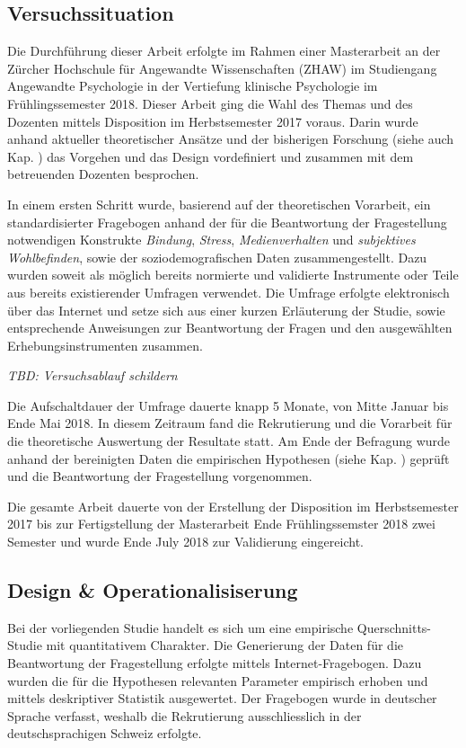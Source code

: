 \subsection{Versuchssituation}\label{sec:Versuchssituation}
Die Durchführung dieser Arbeit erfolgte im Rahmen einer Masterarbeit an der Zürcher Hochschule für Angewandte Wissenschaften (ZHAW) im Studiengang Angewandte Psychologie in der Vertiefung klinische Psychologie im Frühlingssemester 2018. Dieser Arbeit ging die Wahl des Themas und des Dozenten mittels Disposition im Herbstsemester 2017 voraus. Darin wurde anhand aktueller theoretischer Ansätze und der bisherigen Forschung (siehe auch Kap. ) das Vorgehen und das Design vordefiniert und zusammen mit dem betreuenden Dozenten besprochen. 

In einem ersten Schritt wurde, basierend auf der theoretischen Vorarbeit, ein standardisierter Fragebogen anhand der für die Beantwortung der Fragestellung notwendigen Konstrukte \textit{Bindung}, \textit{Stress}, \textit{Medienverhalten} und \textit{subjektives Wohlbefinden}, sowie der soziodemografischen Daten zusammengestellt. Dazu wurden soweit als möglich bereits normierte und validierte Instrumente oder Teile aus bereits existierender Umfragen verwendet. Die Umfrage erfolgte elektronisch über das Internet und setze sich aus einer kurzen Erläuterung der Studie, sowie entsprechende Anweisungen zur Beantwortung der Fragen und den ausgewählten Erhebungsinstrumenten zusammen. 

\textit{TBD: Versuchsablauf schildern}

Die Aufschaltdauer der Umfrage dauerte knapp 5 Monate, von Mitte Januar bis Ende Mai 2018. In diesem Zeitraum fand die Rekrutierung und die Vorarbeit für die theoretische Auswertung der Resultate statt. Am Ende der Befragung wurde anhand der bereinigten Daten die empirischen Hypothesen (siehe Kap. ) geprüft und die Beantwortung der Fragestellung vorgenommen.

Die gesamte Arbeit dauerte von der Erstellung der Disposition im Herbstsemester 2017 bis zur Fertigstellung der Masterarbeit Ende Frühlingssemster 2018 zwei Semester und wurde Ende July 2018 zur Validierung eingereicht.

\subsection{Design \& Operationalisiserung} \label{sec:Design}
Bei der vorliegenden Studie handelt es sich um eine empirische Querschnitts-Studie mit quantitativem Charakter. Die Generierung der Daten für die Beantwortung der Fragestellung erfolgte mittels Internet-Fragebogen. Dazu wurden die für die Hypothesen relevanten Parameter empirisch erhoben und mittels deskriptiver Statistik ausgewertet. Der Fragebogen wurde in deutscher Sprache verfasst, weshalb die Rekrutierung ausschliesslich in der deutschsprachigen Schweiz erfolgte.


